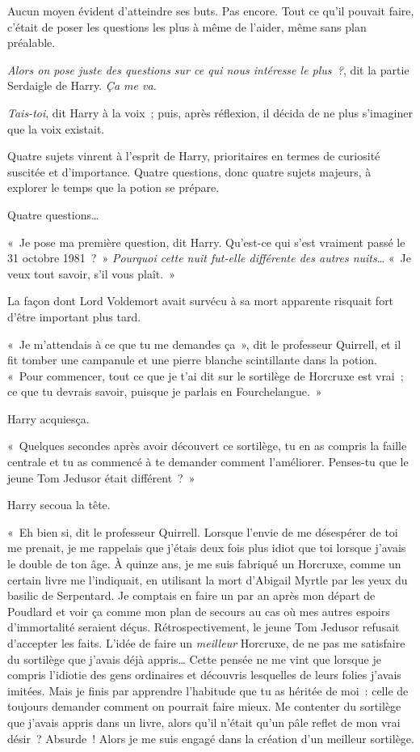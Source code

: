 Aucun moyen évident d'atteindre ses buts.
Pas encore.
Tout ce qu'il pouvait faire, c'était de poser les questions les plus à même de l'aider, même sans plan préalable.

\emph{Alors on pose juste des questions sur ce qui nous intéresse le plus~?}, dit la partie Serdaigle de Harry.
\emph{Ça me va.}

\emph{Tais-toi}, dit Harry à la voix~; puis, après réflexion, il décida de ne plus s'imaginer que la voix existait.

Quatre sujets vinrent à l'esprit de Harry, prioritaires en termes de curiosité suscitée et d'importance.
Quatre questions, donc quatre sujets majeurs, à explorer le temps que la potion se prépare.

Quatre questions…

«~Je pose ma première question, dit Harry.
Qu'est-ce qui s'est vraiment passé le 31 octobre 1981~?~»
\emph{Pourquoi cette nuit fut-elle différente des autres nuits}…
«~Je veux tout savoir, s'il vous plaît.~»

La façon dont Lord Voldemort avait survécu à sa mort apparente risquait fort d'être important plus tard.

«~Je m'attendais à ce que tu me demandes ça~», dit le professeur Quirrell, et il fit tomber une campanule et une pierre blanche scintillante dans la potion.
«~Pour commencer, tout ce que je t'ai dit sur le sortilège de Horcruxe est vrai~; ce que tu devrais savoir, puisque je parlais en Fourchelangue.~»

Harry acquiesça.

«~Quelques secondes après avoir découvert ce sortilège, tu en as compris la faille centrale et tu as commencé à te demander comment l'améliorer.
Penses-tu que le jeune Tom Jedusor était différent~?~»

Harry secoua la tête.

«~Eh bien si, dit le professeur Quirrell.
Lorsque l'envie de me désespérer de toi me prenait, je me rappelais que j'étais deux fois plus idiot que toi lorsque j'avais le double de ton âge.
À quinze ans, je me suis fabriqué un Horcruxe, comme un certain livre me l'indiquait, en utilisant la mort d'Abigail Myrtle par les yeux du basilic de Serpentard.
Je comptais en faire un par an après mon départ de Poudlard et voir ça comme mon plan de secours au cas où mes autres espoirs d'immortalité seraient déçus.
Rétrospectivement, le jeune Tom Jedusor refusait d'accepter les faits.
L'idée de faire un \emph{meilleur} Horcruxe, de ne pas me satisfaire du sortilège que j'avais déjà appris…
Cette pensée ne me vint que lorsque je compris l'idiotie des gens ordinaires et découvris lesquelles de leurs folies j'avais imitées.
Mais je finis par apprendre l'habitude que tu as héritée de moi~: celle de toujours demander comment on pourrait faire mieux.
Me contenter du sortilège que j'avais appris dans un livre, alors qu'il n'était qu'un pâle reflet de mon vrai désir~?
Absurde~!
Alors je me suis engagé dans la création d'un meilleur sortilège.

